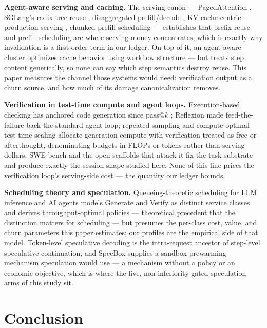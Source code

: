 \documentclass[11pt]{article}
\begin{document}
\textbf{Agent-aware serving and caching.} The serving canon --- PagedAttention \citep{Kwon2023vLLM}, SGLang's radix-tree reuse \citep{Zheng2023SGLang}, disaggregated prefill/decode \citep{Zhong2024DistServe}, KV-cache-centric production serving \citep{Qin2024Mooncake}, chunked-prefill scheduling \citep{Agrawal2024Sarathi} --- establishes that prefix reuse and prefill scheduling are where serving money concentrates, which is exactly why invalidation is a first-order term in our ledger. On top of it, an agent-aware cluster \citep{Pan2025KVFlow,Irminsul2605} optimizes cache behavior using workflow structure --- but treats step content generically, so none can say which step semantics destroy reuse. This paper measures the channel those systems would need: verification output as a churn source, and how much of its damage canonicalization removes.

\textbf{Verification in test-time compute and agent loops.} Execution-based checking has anchored code generation since pass@$k$ \citep{Chen2021Codex}; Reflexion \citep{Shinn2023Reflexion} made feed-the-failure-back the standard agent loop; repeated sampling \citep{Brown2024Monkeys} and compute-optimal test-time scaling \citep{Snell2024TestTime} allocate generation compute with verification treated as free or afterthought, denominating budgets in FLOPs or tokens rather than serving dollars. SWE-bench \citep{Jimenez2024SWEbench} and the open scaffolds that attack it \citep{Yang2024SWEagent,Wang2024OpenHands} fix the task substrate and produce exactly the session shape studied here. None of this line prices the verification loop's serving-side cost --- the quantity our ledger bounds.

\textbf{Scheduling theory and speculation.} Queueing-theoretic scheduling for LLM inference and AI agents \citep{Dai2025Queueing} models Generate and Verify as distinct service classes and derives throughput-optimal policies --- theoretical precedent that the distinction matters for scheduling --- but presumes the per-class cost, value, and churn parameters this paper estimates; our profiles are the empirical side of that model. Token-level speculative decoding \citep{Leviathan2023Spec} is the intra-request ancestor of step-level speculative continuation, and SpecBox \citep{SpecBox2607} supplies a sandbox-prewarming mechanism speculation would use --- a mechanism without a policy or an economic objective, which is where the live, non-inferiority-gated speculation arms of this study sit.

\section{Conclusion}
\end{document}
